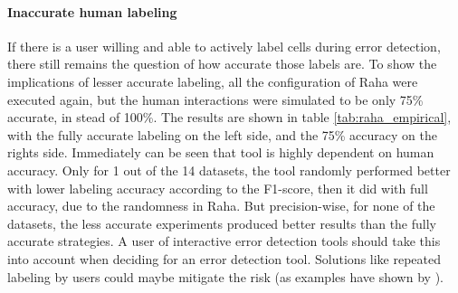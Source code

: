 \paragraph{Inaccurate human labeling} If there is a user willing and able to actively label cells during error detection, there still remains the question of how accurate those labels are. To show the implications of lesser accurate labeling, all the configuration of Raha were executed again, but the human interactions were simulated to be only 75\% accurate, in stead of 100\%. The results are shown in table \ref{tab:raha_empirical}, with the fully accurate labeling on the left side, and the 75\% accuracy on the rights side. Immediately can be seen that tool is highly dependent on human accuracy. Only for 1 out of the 14 datasets, the tool randomly performed better with lower labeling accuracy according to the F1-score, then it did with full accuracy, due to the randomness in Raha. But precision-wise, for none of the datasets, the less accurate experiments produced better results than the fully accurate strategies. A user of interactive error detection tools should take this into account when deciding for an error detection tool. Solutions like repeated labeling by users could maybe mitigate the risk (as examples have shown by \cite{Sheng2008-gk}).

